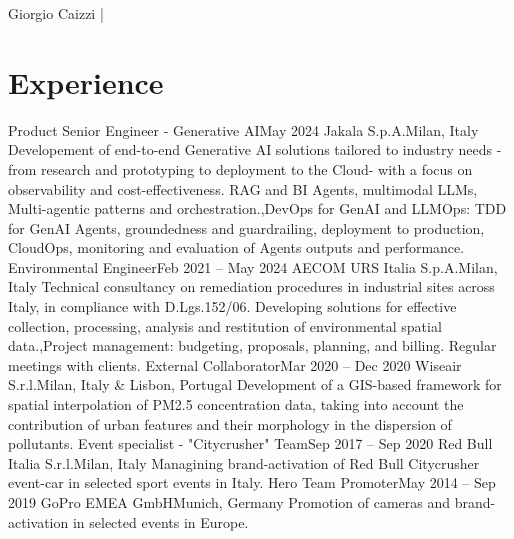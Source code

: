 \documentclass[letterpaper,11pt]{article}
\begin{document}
\resumeHeader
  {Giorgio Caizzi}
  { | }
  {  \\}

\section{Experience}
\begin{sectionElementsList}
  \experienceElement
  {Product Senior Engineer - Generative AI}{May 2024}
  {Jakala S.p.A.}{Milan, Italy}
  {Developement of end-to-end Generative AI solutions tailored to industry needs -from research and prototyping to deployment to the Cloud- with a focus on observability and cost-effectiveness.}
  {{RAG and BI Agents, multimodal LLMs, Multi-agentic patterns and orchestration.},{DevOps for GenAI and LLMOps: TDD for GenAI Agents, groundedness and guardrailing, deployment to production, CloudOps, monitoring and evaluation of Agents outputs and performance.}}
  \experienceElement
  {Environmental Engineer}{Feb 2021 -- May 2024}
  {AECOM URS Italia S.p.A.}{Milan, Italy}
  {Technical consultancy on remediation procedures in industrial sites across Italy, in compliance with D.Lgs.152/06.}
  {{Developing solutions for effective collection, processing, analysis and restitution of environmental spatial data.},{Project management: budgeting, proposals, planning, and billing. Regular meetings with clients.}}
  \experienceElement
  {External Collaborator}{Mar 2020 -- Dec 2020}
  {Wiseair S.r.l.}{Milan, Italy \& Lisbon, Portugal}
  {Development of a GIS-based framework for spatial interpolation of PM2.5 concentration data, taking into account the contribution of urban features and their morphology in the dispersion of pollutants.}
  {}
  \experienceElement
  {Event specialist - "Citycrusher" Team}{Sep 2017 -- Sep 2020}
  {Red Bull Italia S.r.l.}{Milan, Italy}
  {Managining brand-activation of Red Bull Citycrusher event-car in selected sport events in Italy.}
  {}
  \experienceElement
  {Hero Team Promoter}{May 2014 -- Sep 2019}
  {GoPro EMEA GmbH}{Munich, Germany}
  {Promotion of cameras and brand-activation in selected events in Europe.}
  {}
\end{sectionElementsList}

\end{document}
